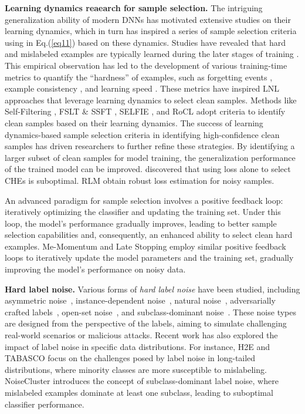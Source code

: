 \textbf{Learning dynamics reaearch for sample selection.}
The intriguing generalization ability of modern DNNs has motivated extensive studies on their learning dynamics, which in turn has inspired a series of sample selection criteria using in Eq.(\ref{eq11}) based on these dynamics. Studies have revealed that hard and mislabeled examples are typically learned during the later stages of training \cite{arpit2017closer, toneva2018empirical, song2019does, song2021robust, maini2022characterizing, bai2021understanding, lin2024on}. This empirical observation has led to the development of various training-time metrics to quantify the ``hardness'' of examples, such as forgetting events \cite{toneva2018empirical}, example consistency \cite{pleiss2020identifying}, and learning speed \cite{maini2022characterizing, jiang2021characterizing}. These metrics have inspired LNL approaches that leverage learning dynamics to select clean samples.
Methods like Self-Filtering \cite{wei2022self}, FSLT \& SSFT \cite{maini2022characterizing}, SELFIE \cite{song2019selfie}, and RoCL \cite{zhou2021robust} adopt criteria to identify clean samples based on their learning dynamics. The success of learning dynamics-based sample selection criteria in identifying high-confidence clean samples has driven researchers to further refine these strategies.
By identifying a larger subset of clean samples for model training, the generalization performance of the trained model can be improved. \cite{xia2021sample} discovered that using loss alone to select CHEs is suboptimal. RLM \cite{li2024regroup} obtain robust loss estimation for noisy samples.

An advanced paradigm for sample selection involves a positive feedback loop: iteratively optimizing the classifier and updating the training set. Under this loop, the model's performance gradually improves, leading to better sample selection capabilities and, consequently, an enhanced ability to select clean hard examples. Me-Momentum \cite{bai2021me} and Late Stopping \cite{yuan2023late} employ similar positive feedback loops to iteratively update the model parameters and the training set, gradually improving the model's performance on noisy data.

\textbf{Hard label noise.}
Various forms of \textit{hard label noise} have been studied, including asymmetric noise~\cite{scott2013classification}, instance-dependent noise~\cite{xia2020part}, natural noise~\cite{wei2021learning}, adversarially crafted labels~\cite{zhang2024badlabel}, open-set noise~\cite{wei2021open}, and subclass-dominant noise~\cite{bai2023subclassdominant}. These noise types are designed from the perspective of the labels, aiming to simulate challenging real-world scenarios or malicious attacks. 
Recent work has also explored the impact of label noise in specific data distributions. For instance, H2E \cite{yi2022identifying} and TABASCO \cite{lu2023label} focus on the challenges posed by label noise in long-tailed distributions, where minority classes are more susceptible to mislabeling. NoiseCluster \cite{bai2023subclassdominant} introduces the concept of subclass-dominant label noise, where mislabeled examples dominate at least one subclass, leading to suboptimal classifier performance.

